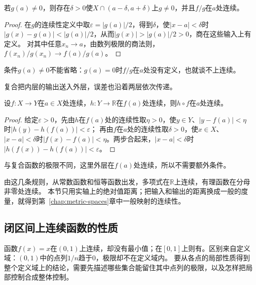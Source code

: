 \begin{theorem}[商的连续性]
\label{thm:ru-continuity-quotient}
若$g(a)\neq0$，则存在$\delta>0$使$X\cap(a-\delta,a+\delta)$上$g\neq0$，并且$f/g$在$a$处连续。
\end{theorem}
\begin{proof}
在$g$的连续性定义中取$\varepsilon=|g(a)|/2$，得到$\delta$，使$|x-a|<\delta$时$|g(x)-g(a)|<|g(a)|/2$，从而$|g(x)|>|g(a)|/2>0$，商在这些输入上有定义。
对其中任意$x_n\to a$，由数列极限的商法则，$f(x_n)/g(x_n)\to f(a)/g(a)$。
\end{proof}
条件$g(a)\neq0$不能省略：$g(a)=0$时$f/g$在$a$处没有定义，也就谈不上连续。

复合把内层的输出送入外层，误差也沿着两层依次传递。
\begin{theorem}[复合函数的连续性]
\label{thm:ru-continuity-composition}
设$f:X\to Y$在$a\in X$处连续，$h:Y\to\mathbb R$在$f(a)$处连续，则$h\circ f$在$a$处连续。
\end{theorem}
\begin{proof}
给定$\varepsilon>0$，先由$h$在$f(a)$处的连续性取$\eta>0$，使$y\in Y$、$|y-f(a)|<\eta$时$|h(y)-h(f(a))|<\varepsilon$；
再由$f$在$a$处的连续性取$\delta>0$，使$x\in X$、$|x-a|<\delta$时$|f(x)-f(a)|<\eta$。两步合起来，$|x-a|<\delta$时$|h(f(x))-h(f(a))|<\varepsilon$。
\end{proof}
与复合函数的极限不同，这里外层在$f(a)$处连续，所以不需要额外条件。

由这几条规则，从常数函数和恒等函数出发，多项式在$\mathbb R$上连续，有理函数在分母非零处连续。
本节只用实轴上的绝对值距离；把输入和输出的距离换成一般的度量，就得到第~\ref{chap:metric-spaces}章中一般映射的连续性。

\subsection{闭区间上连续函数的性质}
\label{sec:ru-closed-interval-continuity}
\label{sec:analysis-metric-measurement}
\label{sec:analysis-set-metric}

函数$f(x)=x$在$(0,1)$上连续，却没有最小值；在$[0,1]$上则有。区别来自定义域：$(0,1)$中的点列$1/n$趋于$0$，极限却不在定义域内。
要从各点的局部性质得到整个定义域上的结论，需要先描述哪些集合能留住其中点列的极限，以及怎样把局部控制合成整体控制。

